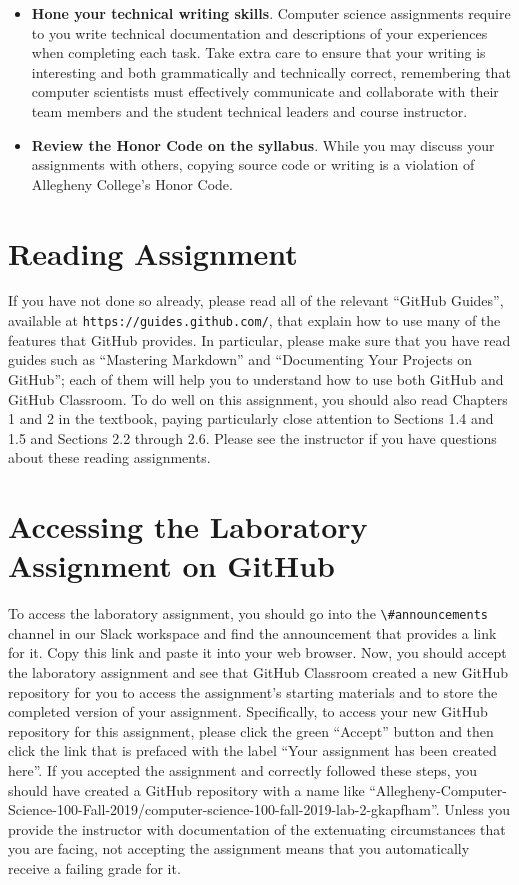 \documentclass[11pt]{article}
\newcommand{\url}[1]{\lstinline{#1}}
\newcommand{\channel}[1]{\lstinline{#1}}
\begin{document}
\begin{itemize}
\item {\bf Hone your technical writing skills}. Computer science assignments
  require to you write technical documentation and descriptions of your
  experiences when completing each task. Take extra care to ensure that your
  writing is interesting and both grammatically and technically correct,
  remembering that computer scientists must effectively communicate and
  collaborate with their team members and the student technical leaders and
  course instructor.

\item {\bf Review the Honor Code on the syllabus}. While you may discuss your
  assignments with others, copying source code or writing is a violation of
  Allegheny College's Honor Code.

\end{itemize}

\section*{Reading Assignment}

If you have not done so already, please read all of the relevant ``GitHub
Guides'', available at \url{https://guides.github.com/}, that explain how to use
many of the features that GitHub provides. In particular, please make sure that
you have read guides such as ``Mastering Markdown'' and ``Documenting Your
Projects on GitHub''; each of them will help you to understand how to use both
GitHub and GitHub Classroom. To do well on this assignment, you should also read
Chapters 1 and 2 in the textbook, paying particularly close attention to
Sections 1.4 and 1.5 and Sections 2.2 through 2.6. Please see the instructor if
you have questions about these reading assignments.

\section*{Accessing the Laboratory Assignment on GitHub}

To access the laboratory assignment, you should go into the
\channel{\#announcements} channel in our Slack workspace and find the
announcement that provides a link for it. Copy this link and paste it into your
web browser. Now, you should accept the laboratory assignment and see that
GitHub Classroom created a new GitHub repository for you to access the
assignment's starting materials and to store the completed version of your
assignment. Specifically, to access your new GitHub repository for this
assignment, please click the green ``Accept'' button and then click the link
that is prefaced with the label ``Your assignment has been created here''. If
you accepted the assignment and correctly followed these steps, you should have
created a GitHub repository with a name like
``Allegheny-Computer-Science-100-Fall-2019/computer-science-100-fall-2019-lab-2-gkapfham''.
Unless you provide the instructor with documentation of the extenuating
circumstances that you are facing, not accepting the assignment means that you
automatically receive a failing grade for it.
\end{document}
